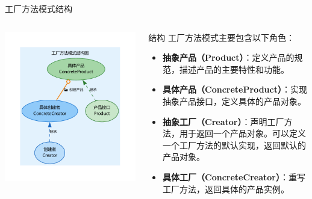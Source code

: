 \documentclass[UTF8,aspectratio=169]{beamer}
\begin{document}
\begin{frame}{工厂方法模式结构}
    \begin{columns}
        \begin{column}{0.48\textwidth}
            \includegraphics[width=1.0\textwidth]{images/factory_method_pattern.pdf}
        \end{column}
        \begin{column}{0.48\textwidth}
            \begin{ytublock}{结构}
                工厂方法模式主要包含以下角色：
                \begin{itemize}
                    \item \textbf{抽象产品（Product）}：定义产品的规范，描述产品的主要特性和功能。
                    \item \textbf{具体产品（ConcreteProduct）}：实现抽象产品接口，定义具体的产品对象。
                    \item \textbf{抽象工厂（Creator）}：声明工厂方法，用于返回一个产品对象。可以定义一个工厂方法的默认实现，返回默认的产品对象。
                    \item \textbf{具体工厂（ConcreteCreator）}：重写工厂方法，返回具体的产品实例。
                \end{itemize}
            \end{ytublock}
        \end{column}
    \end{columns}
\end{frame}
\end{document}
